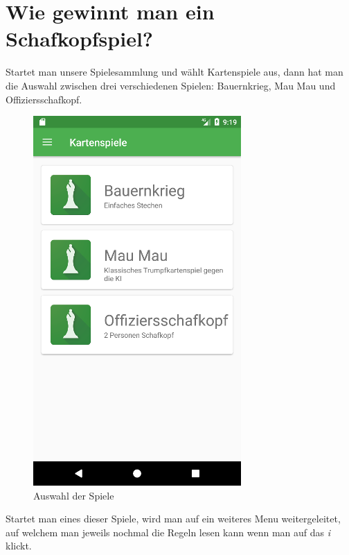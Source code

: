 \section{Wie gewinnt man ein Schafkopfspiel?}
\sectionauthor{\philipp}
Startet man unsere Spielesammlung und wählt Kartenspiele aus, dann hat man die Auswahl zwischen drei verschiedenen Spielen: Bauernkrieg, Mau Mau und Offiziersschafkopf.
\begin{figure}[h]
	\centering
	\includegraphics{resources/kartenscreens/auswahl}
	\caption{Auswahl der Spiele}
	\label{fig:gm_uml}
\end{figure}
Startet man eines dieser Spiele, wird man auf ein weiteres Menu weitergeleitet, auf welchem man jeweils nochmal die Regeln lesen kann wenn man auf das \emph{i} klickt.
